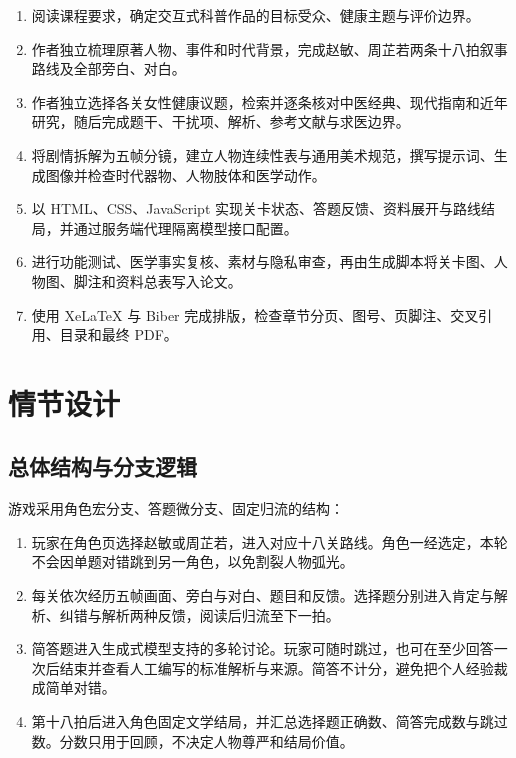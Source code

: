 \documentclass[lang=cn,a4paper,11pt,citestyle=gb7714-2015,bibstyle=gb7714-2015]{elegantpaper}
\begin{document}
\begin{enumerate}[leftmargin=*]
  \item 阅读课程要求，确定交互式科普作品的目标受众、健康主题与评价边界。
  \item 作者独立梳理原著人物、事件和时代背景，完成赵敏、周芷若两条十八拍叙事路线及全部旁白、对白。
  \item 作者独立选择各关女性健康议题，检索并逐条核对中医经典、现代指南和近年研究，随后完成题干、干扰项、解析、参考文献与求医边界。
  \item 将剧情拆解为五帧分镜，建立人物连续性表与通用美术规范，撰写提示词、生成图像并检查时代器物、人物肢体和医学动作。
  \item 以 HTML、CSS、JavaScript 实现关卡状态、答题反馈、资料展开与路线结局，并通过服务端代理隔离模型接口配置。
  \item 进行功能测试、医学事实复核、素材与隐私审查，再由生成脚本将关卡图、人物图、脚注和资料总表写入论文。
  \item 使用 XeLaTeX 与 Biber 完成排版，检查章节分页、图号、页脚注、交叉引用、目录和最终 PDF。
\end{enumerate}

\clearpage
\section{情节设计}\label{sec:plots}

\subsection{总体结构与分支逻辑}

游戏采用角色宏分支、答题微分支、固定归流的结构：

\begin{enumerate}[leftmargin=*]
  \item 玩家在角色页选择赵敏或周芷若，进入对应十八关路线。角色一经选定，本轮不会因单题对错跳到另一角色，以免割裂人物弧光。
  \item 每关依次经历五帧画面、旁白与对白、题目和反馈。选择题分别进入肯定与解析、纠错与解析两种反馈，阅读后归流至下一拍。
  \item 简答题进入生成式模型支持的多轮讨论。玩家可随时跳过，也可在至少回答一次后结束并查看人工编写的标准解析与来源。简答不计分，避免把个人经验裁成简单对错。
  \item 第十八拍后进入角色固定文学结局，并汇总选择题正确数、简答完成数与跳过数。分数只用于回顾，不决定人物尊严和结局价值。
\end{enumerate}
\end{document}
